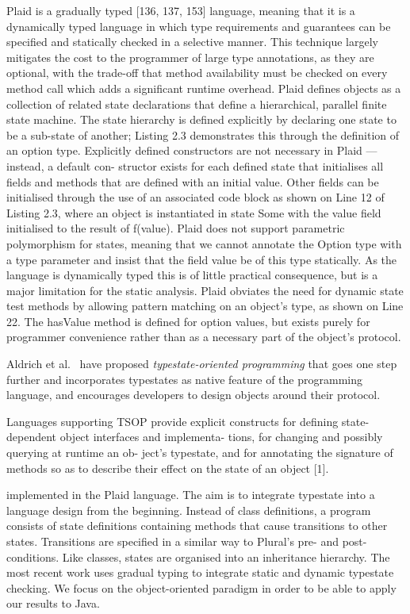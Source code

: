 Plaid is a gradually typed [136, 137, 153] language, meaning that it is a dynamically typed language in which type requirements and guarantees can be specified and statically checked in a selective manner. This technique largely mitigates the cost to the programmer of large type annotations, as they are optional, with the trade-off that method availability must be checked on every method call which adds a significant runtime overhead.
Plaid defines objects as a collection of related state declarations that define a hierarchical, parallel finite state machine. The state hierarchy is defined explicitly by declaring one state to be a sub-state of another; Listing 2.3 demonstrates this through the definition of an option type. Explicitly defined constructors are not necessary in Plaid — instead, a default con- structor exists for each defined state that initialises all fields and methods that are defined with an initial value. Other fields can be initialised through the use of an associated code block as shown on Line 12 of Listing 2.3, where an object is instantiated in state Some with the value field initialised to the result of f(value).
Plaid does not support parametric polymorphism for states, meaning that we cannot annotate the Option type with a type parameter and insist that the field value be of this type statically. As the language is dynamically typed this is of little practical consequence, but is a major limitation for the static analysis.
Plaid obviates the need for dynamic state test methods by allowing pattern matching on an object’s type, as shown on Line 22. The hasValue method is defined for option values, but exists purely for programmer convenience rather than as a necessary part of the object’s protocol.


Aldrich {et
  al.}~\cite{DBLP:conf/oopsla/AldrichSSS09,DBLP:conf/oopsla/SunshineNSAT11}
have proposed \emph{typestate-oriented programming} that goes one step further and incorporates typestates as native feature of the programming language, and encourages developers  to design objects around their protocol. 


Languages supporting TSOP provide explicit constructs for defining state-dependent object interfaces and implementa- tions, for changing and possibly querying at runtime an ob- ject’s typestate, and for annotating the signature of methods so as to describe their effect on the state of an object [1].

implemented in the Plaid language. The aim is to integrate typestate
into a language design from the beginning. Instead of class definitions,
a program consists of state definitions containing methods that cause
transitions to other states. Transitions are specified in a similar way
to Plural's pre- and post-conditions. Like classes, states are organised
into an inheritance hierarchy. The most recent work
\cite{GarciaR:foutop,WolffR:grat} uses gradual typing to integrate
static and dynamic typestate checking. We focus on the object-oriented
paradigm in order to be able to apply our results to Java.



